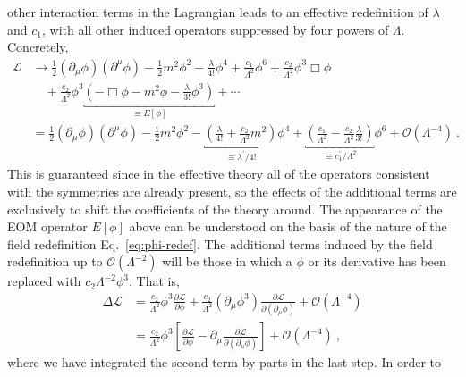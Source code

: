 other interaction terms in the Lagrangian leads to an effective redefinition of
$\lambda$ and $c_{1}$, with all other induced operators suppressed by four
powers of $\Lambda$. Concretely,
\begin{equation}
  \begin{aligned}
    \mathscr{L} &\to \frac{1}{2} (\partial_{\mu} \phi) (\partial^{\mu} \phi) - \frac{1}{2} m^{2} \phi^{2} - \frac{\lambda}{4!} \phi^{4} + \frac{c_{1}}{\Lambda^{2}} \phi^{6} + \frac{c_{2}}{\Lambda^{2}} \phi^{3} \Box \phi \\
    &\quad + \frac{c_{2}}{\Lambda^{2}} \phi^{3} \underbracket{\left( - \Box \phi - m^{2} \phi - \frac{\lambda}{3!}\phi^{3} \right)}_{\equiv E[\phi]} + \cdots \\
    &= \frac{1}{2} (\partial_{\mu} \phi) (\partial^{\mu} \phi) - \frac{1}{2} m^{2} \phi^{2} - \underbracket{\left( \frac{\lambda}{4!} + \frac{c_{2}}{\Lambda^{2}}m^{2} \right)}_{\equiv \lambda^{\prime} / 4!} \phi^{4} + \underbracket{\left( \frac{c_{1}}{\Lambda^{2}} - \frac{c_{2}}{\Lambda^{2}} \frac{\lambda}{3!} \right)}_{\equiv c^{\prime}_{1} / \Lambda^{2}}\phi^{6} + \mathcal{O}(\Lambda^{-4}) \ .
  \end{aligned}
\end{equation}
This is guaranteed since in the effective theory all of the operators consistent
with the symmetries are already present, so the effects of the additional terms
are exclusively to shift the coefficients of the theory around. The appearance
of the EOM operator $E[\phi]$ above can be understood on the basis of the nature
of the field redefinition Eq.~\eqref{eq:phi-redef}. The additional terms induced
by the field redefinition up to $\mathcal{O}(\Lambda^{-2})$ will be those in
which a $\phi$ or its derivative has been replaced with
$c_{2} \Lambda^{-2} \phi^{3}$. That is,
\begin{equation}
  \begin{aligned}
    \Delta \mathscr{L} &= \frac{c_{2}}{\Lambda^{2}} \phi^{3} \frac{\partial \mathscr{L}}{\partial \phi} + \frac{c_{2}}{\Lambda^{2}} (\partial_{\mu} \phi^{3}) \frac{\partial \mathscr{L}}{\partial (\partial_{\mu} \phi)} + \mathcal{O}(\Lambda^{-4}) \\
    &= \frac{c_{2}}{\Lambda^{2}} \phi^{3} \left[ \frac{\partial \mathscr{L}}{\partial \phi} - \partial_{\mu} \frac{\partial \mathscr{L}}{\partial (\partial_{\mu} \phi)} \right]  + \mathcal{O}(\Lambda^{-4}) \ ,
  \end{aligned}
\end{equation}
where we have integrated the second term by parts in the last step. In order to
